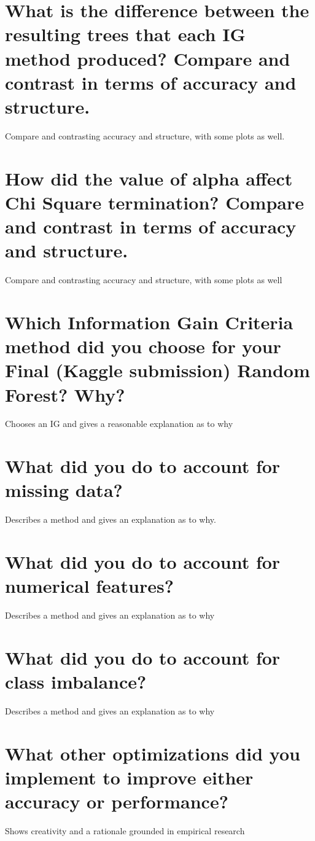 \documentclass{article}
\begin{document}
\section{What is the difference between the resulting trees that each IG method produced? Compare and contrast in terms of accuracy and structure.}
Compare and contrasting accuracy and structure, with some
plots as well.

\section{How did the value of alpha affect Chi Square termination? Compare and contrast in terms of accuracy and structure.}
Compare and contrasting accuracy and structure, with some
plots as well

\section{Which Information Gain Criteria method did you
choose for your Final (Kaggle submission) Random Forest? Why?}
Chooses an IG and gives a reasonable explanation as to why

\section{What did you do to account for missing data?}
Describes a method and gives an explanation as to why.
\section{What did you do to account for numerical features?}
Describes a method and gives an explanation as to why

\section{What did you do to account for class imbalance?}
Describes a method and gives an explanation as to why
\section{What other optimizations did you implement to improve either accuracy or performance?}
Shows creativity and a rationale grounded in empirical research
\end{document}

